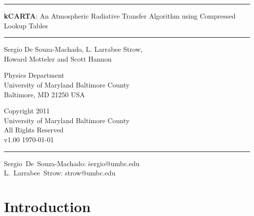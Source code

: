 \documentclass[12pt]{article}
\newcommand{\HRule}{\rule{\linewidth}{1mm}}
\newcommand{\HRulethin}{\rule{\linewidth}{0.5mm}}
\begin{document}
\thispagestyle{empty}
\vspace{2.0in}

\noindent\HRule
\begin{center}
\Huge \textbf{\textsf{kCARTA}}: An Atmospheric Radiative Transfer Algorithm 
using Compressed Lookup Tables
\end{center}
\noindent\HRule

\vspace{0.75in}
\begin{center}
\begin{Large}
Sergio De Souza-Machado, L. Larrabee Strow,\\ Howard Motteler and Scott
Hannon
\end{Large}
\end{center}

\vspace{0.5in}
\begin{center}
Physics Department\\
University of Maryland Baltimore County\\Baltimore, MD 21250 USA\\
\end{center}

\vspace{0.5in}
\begin{center}
Copyright 2011 \\
University of Maryland Baltimore County \\
All Rights Reserved\\
v1.00  \today\\
\end{center}

\vfill

\noindent\HRulethin
\begin{flushleft}
\begin{tabbing}
Sergio~De~Souza-Machado: \=    sergio@umbc.edu \\
L.~Larrabee~Strow:   \>        strow@umbc.edu\\
\end{tabbing}
\end{flushleft}


\newpage
\tableofcontents
\newpage

\newpage
\section{Introduction}
\end{document}
